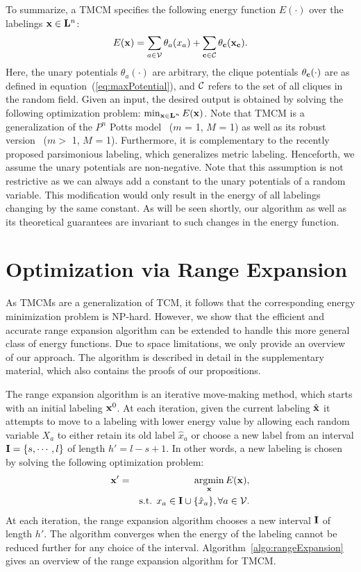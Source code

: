 \documentclass[runningheads]{llncs}
\newcommand{\argmin}{\operatornamewithlimits{argmin}}
\newcommand{\mysection}[1]{\vspace{-2mm}\section{#1}\vspace{-2mm}}
\begin{document}
To summarize, a TMCM specifies the following energy function $E(\cdot)$ over the labelings ${\bf x} \in {\bf L}^n$:
\begin{equation}
\small E({\bf x}) = \sum_{a \in {\cal V}} \theta_a(x_a) + \sum_{{\bf c} \in {\cal C}} \theta_{\bf c}({\bf x}_{\bf c}).
\end{equation}
Here, the unary potentials $\theta_a(\cdot)$ are arbitrary, the clique potentials $\theta_{\bf c}(\cdot)$ are as defined in
equation~(\ref{eq:maxPotential}), and ${\cal C}$ refers to the set of all cliques in the random field.  Given an input, the
desired output is obtained by solving the following optimization problem: $\min_{{\bf x} \in {\bf L}^n} E({\bf x})$. Note that TMCM is a generalization of the $P^n$ Potts model~\cite{kohlicvpr07} ($m$ = 1, $M$ = 1) as well as its robust version~\cite{kohlicvpr08} ($m > $  1, $M$ = 1). Furthermore, it is complementary to the recently proposed parsimonious labeling, which generalizes metric labeling.
Henceforth, we assume the
unary potentials are non-negative. Note that this assumption is not restrictive as we can always add a constant to the unary potentials
of a random variable. This modification would only result in the energy of all labelings changing by the same constant. As will be seen
shortly, our algorithm as well as its theoretical guarantees are invariant to such changes in the energy function.

\mysection{Optimization via Range Expansion}
As TMCMs are a generalization of TCM, it follows that the corresponding energy
minimization problem is NP-hard. However, we show that the efficient and accurate
range expansion algorithm can be extended to handle this more general class
of energy functions. Due to space limitations, we only provide an overview of our
approach. The algorithm is described in detail in the supplementary
material, which also contains the proofs of our propositions.

The range expansion algorithm is an iterative move-making method, which starts with an initial labeling
${\bf x}^0$. At each iteration, given the current labeling $\hat{\bf x}$ it attempts to move to a labeling with lower energy value
by allowing each random variable $X_a$ to either retain its old label $\hat{x}_a$ or choose a new label from an
interval ${\bf I} = \{s,\cdots,l\}$ of length $h' = l-s+1$. In other words, a new labeling is chosen by solving the
following optimization problem:
\begin{eqnarray}
{\bf x}' = && \argmin_{\bf x} E({\bf x}), \nonumber \\
&& \mbox{s.t. } x_a \in {\bf I} \cup \{\hat{x}_a\}, \forall a \in {\cal V}.
\label{eq:rangeMove}
\end{eqnarray}
At each iteration, the range expansion algorithm chooses a new interval ${\bf I}$ of length $h'$. The algorithm converges
when the energy of the labeling cannot be reduced further for any choice of the interval. Algorithm~\ref{algo:rangeExpansion} gives an overview of the range expansion algorithm for TMCM.
\end{document}
